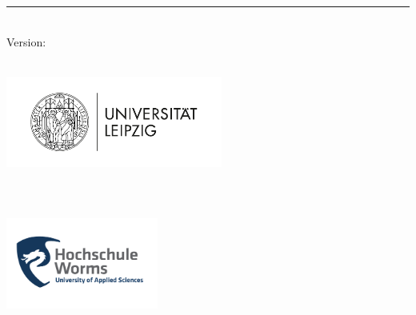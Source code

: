 %
\begin{titlepage}
	\flushright
	\hfill
	\vfill
	{\LARGE\thesisTitle \par}
	\rule[5pt]{\textwidth}{.4pt} \par
	{\Large\thesisName}
	\vfill
	\textit{\large\thesisDate} \\
	Version: \thesisVersion
\end{titlepage}


\begin{titlepage}
	\tgherosfont
	\centering

	\begin{multicols}{2}
    
        {\Large \thesisUniversity} \\[4mm]
        \includegraphics[height=3cm]{gfx/Leipzig_logo} \\[2mm]
        \textsf{\thesisUniversityDepartment} \\
        \textsf{\thesisUniversityGroup} \\

        {\Large \supervisionUniversity} \\[4mm]
        \includegraphics[height=3cm]{gfx/HS_Worms_Logo_farbig_RGB} \\[2mm]
        \textsf{\supervisionUniversityDepartment} \\
        \textsf{\supervisionUniversityGroup} \\
    
    \end{multicols}

	\vfill
	{\large \thesisSubject} \\[5mm]
	{\LARGE \color{ctcolortitle}\textbf{\thesisTitle} \\[10mm]}
	{\Large \thesisName} \\


\end{titlepage}

